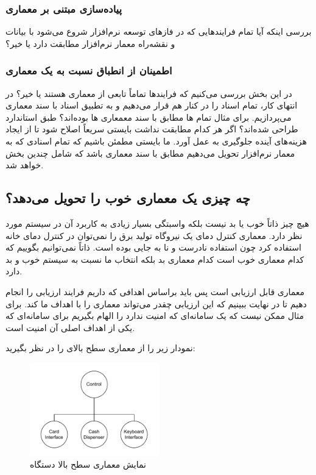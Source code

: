 \subsubsection{پیاده‌سازی مبتنی بر معماری}

بررسی اینکه آیا تمام فرایند‌هایی که در فاز‌های توسعه نرم‌افزار شروع می‌شود با
بیانات و نقشه‌راه معمار نرم‌افزار مطابقت دارد یا خیر؟

\subsubsection{اطمینان از انطباق نسبت به یک معماری}

در این بخش بررسی می‌کنیم که فرایند‌ها تماماً تابعی از معماری هستند یا خیر؟ در
انتهای کار، تمام‌ اسناد را در کنار هم قرار می‌دهیم و به تطبیق اسناد با سند
معماری می‌پردازیم. برای مثال تمام ها مطابق با سند معمعاری
ها بوده‌اند؟ طبق استاندارد طراحی شده‌اند؟ اگر هر کدام مطابقت نداشت
بایستی سریعاً اصلاح شود تا از ایجاد هزینه‌های آینده جلوگیری به عمل آورد. ما
بایستی مطمئن باشیم که تمام اسنادی که به معمار نرم‌افزار تحویل می‌دهیم مطابق با
سند معماری باشد که شامل چندین بخش خواهد شد.

\subsection{چه چیزی یک معماری خوب را تحویل می‌دهد؟}

هیچ چیز ذاتاً خوب یا بد نیست بلکه واسبتگی بسیار زیادی به کاربرد آن در سیستم مورد
نظر دارد. معماری کنترل دمای یک نیروگاه تولید برق را نمی‌توان در کنترل دمای خانه
استفاده کرد چون استفاده نادرست و نا به جایی بوده است. ذاتاً نمی‌توانیم بگوییم که
کدام معماری خوب است کدام معماری بد بلکه انتخاب ما نسبت به سیستم خوب و بد دارد.

معماری قابل ارزیابی است پس باید براساس اهدافی که داریم فرایند ارزیابی را انجام
دهیم تا در نهایت ببینیم که این ارزیابی چقدر می‌تواند معماری را با اهداف ما
 کند. برای مثال ممکن نیست که یک سامانه‌ای که امنیت ندارد را الهام
بگیریم برای سامانه‌ای که یکی از اهداف اصلی آن امنیت است.

نمودار زیر را از معماری سطح بالای  را در نظر بگیرید:

\begin{figure}[H]
    \centering
    \includegraphics[width=0.5\textwidth]{images/bad-arch-of-atm.drawio.pdf}
    \caption{نمایش معماری سطح بالا دستگاه }
    \label{fig:atmDiagram}
\end{figure}

